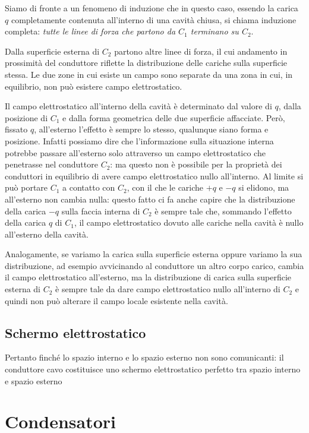 \documentclass[class=book, crop=false, oneside, 12pt]{standalone}
\begin{document}
Siamo di fronte a un fenomeno di induzione che in questo caso, essendo la carica \(q\) completamente contenuta all'interno di una cavità chiusa, si chiama induzione completa: \emph{tutte le linee di forza che partono da \(C_1\) terminano su \(C_2\)}.

Dalla superficie esterna di \(C_2\) partono altre linee di forza, il cui andamento in prossimità del conduttore riflette la distribuzione delle cariche sulla superficie stessa. 
Le due zone in cui esiste un campo sono separate da una zona in cui, in equilibrio, non può esistere campo elettrostatico. 

Il campo elettrostatico all'interno della cavità è determinato dal valore di \(q\), dalla posizione di \(C_1\) e dalla forma geometrica delle due superficie affacciate. 
Però, fissato \(q\), all'esterno l'effetto è sempre lo stesso, qualunque siano forma e  posizione. 
Infatti possiamo dire che l'informazione sulla situazione interna potrebbe passare all'esterno solo attraverso un campo elettrostatico che penetrasse nel conduttore \(C_2\): ma questo non è possibile per la proprietà dei conduttori in equilibrio di avere campo elettrostatico nullo all'interno. 
Al limite si può portare \(C_1\) a contatto con \(C_2\), con il che le cariche \(+q\) e \(-q\) si elidono, ma all'esterno non cambia nulla: questo fatto ci fa anche capire che la distribuzione della carica \(-q\) sulla faccia interna di \(C_2\) è sempre tale che, sommando l'effetto della carica \(q\) di \(C_1\), il campo elettrostatico dovuto alle cariche nella cavità è nullo all'esterno della cavità.

Analogamente, se variamo la carica sulla superficie esterna oppure variamo la sua distribuzione, ad esempio avvicinando al conduttore un altro corpo carico, cambia il campo elettrostatico all'esterno, ma la distribuzione di carica sulla superficie esterna di \(C_2\) è sempre tale da dare campo elettrostatico nullo all'interno di \(C_2\) e quindi non può alterare il campo locale esistente nella cavità. 

\subsection{Schermo elettrostatico}

Pertanto finché lo spazio interno e lo spazio esterno non sono comunicanti: il conduttore cavo costituisce uno schermo elettrostatico perfetto tra spazio interno e spazio esterno

\section{Condensatori}
\end{document}
